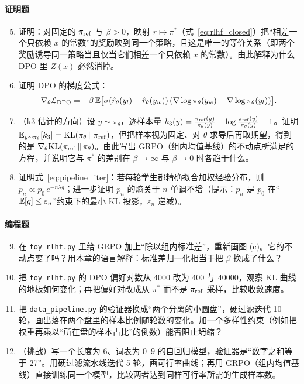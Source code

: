 \paragraph{证明题}
\begin{enumerate}
    \setcounter{enumi}{4}
    \item 证明：对固定的 $\pi_{\rm ref}$ 与 $\beta > 0$，映射 $r \mapsto \pi^*$（式~\eqref{eq:rlhf_closed}）把“相差一个只依赖 $x$ 的常数”的奖励映到同一个策略，且这是唯一的等价关系（即两个奖励诱导同一策略当且仅当它们相差一个只依赖 $x$ 的常数）。由此解释为什么 DPO 里 $Z(x)$ 必然消掉。

    \item 证明 DPO 的梯度公式：
    \[
    \nabla_\theta\mathcal{L}_{\rm DPO} = -\beta\,\mathbb{E}\big[\sigma(\hat r_\theta(y_l) - \hat r_\theta(y_w))\,(\nabla\log\pi_\theta(y_w) - \nabla\log\pi_\theta(y_l))\big].
    \]

    \item （k3 估计的方向）设 $y \sim \pi_\theta$，逐样本量 $k_3(y) = \frac{\pi_{\rm ref}(y)}{\pi_\theta(y)} - \log\frac{\pi_{\rm ref}(y)}{\pi_\theta(y)} - 1$。证明 $\mathbb{E}_{y\sim\pi_\theta}[k_3] = \mathrm{KL}(\pi_\theta\,\|\,\pi_{\rm ref})$，但把样本视为固定、对 $\theta$ 求导后再取期望，得到的是 $\nabla_\theta\mathrm{KL}(\pi_{\rm ref}\,\|\,\pi_\theta)$。由此写出 GRPO（组内均值基线）的不动点所满足的方程，并说明它与 $\pi^*$ 的差别在 $\beta \to \infty$ 与 $\beta \to 0$ 时各趋于什么。

    \item 证明式~\eqref{eq:pipeline_iter}：若每轮学生都精确拟合加权经验分布，则 $p_n \propto p_0\,e^{-n\lambda g}$；进一步证明 $p_n$ 的熵关于 $n$ 单调不增（提示：$p_n$ 是 $p_0$ 在“$\mathbb{E}[g] \le \varepsilon_n$”约束下的最小 KL 投影，$\varepsilon_n$ 递减）。
\end{enumerate}

\paragraph{编程题}
\begin{enumerate}
    \setcounter{enumi}{8}
    \item 在 \texttt{toy\_rlhf.py} 里给 GRPO 加上“除以组内标准差”，重新画图 (c)。它的不动点变了吗？用本章的语言解释：标准差归一化相当于把 $\beta$ 换成了什么？

    \item 把 \texttt{toy\_rlhf.py} 的 DPO 偏好对数从 4000 改为 400 与 40000，观察 KL 曲线的地板如何变化；再把偏好对改成从 $\pi^*$ 而不是 $\pi_{\rm ref}$ 采样，比较收敛速度。

    \item 把 \texttt{data\_pipeline.py} 的验证器换成“两个分离的小圆盘”，硬过滤迭代 10 轮，画出落在两个盘里的样本比例随轮数的变化。加一个多样性约束（例如把权重再乘以“所在盘的样本占比”的倒数）能否阻止坍缩？

    \item （挑战）写一个长度为 6、词表为 0--9 的自回归模型，验证器是“数字之和等于 27”。用硬过滤流水线迭代 5 轮，画可行率曲线；再用 GRPO（组内均值基线）直接训练同一个模型，比较两者达到同样可行率所需的生成样本数。
\end{enumerate}

